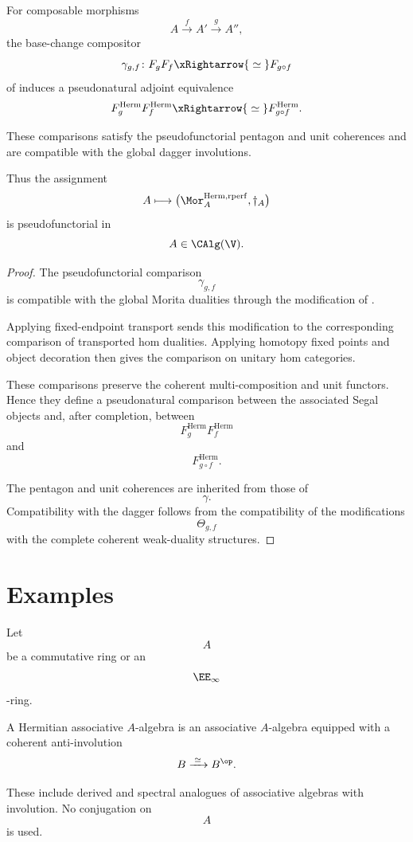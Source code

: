 \begin{proposition}
\label{prop:hermitian-morita-base-change-pseudofunctorial}
For composable morphisms
\[
    A
    \xrightarrow{f}
    A'
    \xrightarrow{g}
    A'',
\]
the base-change compositor
\[
    \gamma_{g,f}
    \colon
    F_gF_f
    \xRightarrow{\;\simeq\;}
    F_{g\circ f}
\]
of
induces a pseudonatural adjoint equivalence
\[
    F_g^{\mathrm{Herm}}
    F_f^{\mathrm{Herm}}
    \xRightarrow{\;\simeq\;}
    F_{g\circ f}^{\mathrm{Herm}}.
\]

These comparisons satisfy the pseudofunctorial pentagon and unit
coherences and are compatible with the global dagger involutions.

Thus the assignment
\[
    A
    \longmapsto
    \bigl(
        \Mor_A^{\mathrm{Herm,rperf}},
        \dagger_A
    \bigr)
\]
is pseudofunctorial in
\[
    A\in\CAlg(\V).
\]
\end{proposition}

\begin{proof}
The pseudofunctorial comparison
\[
    \gamma_{g,f}
\]
is compatible with the global Morita dualities through the modification
of
.

Applying fixed-endpoint transport sends this modification to the
corresponding comparison of transported hom dualities. Applying
homotopy fixed points and object decoration then gives the comparison on
unitary hom categories.

These comparisons preserve the coherent multi-composition and unit
functors. Hence they define a pseudonatural comparison between the
associated Segal objects and, after completion, between
\[
    F_g^{\mathrm{Herm}}F_f^{\mathrm{Herm}}
\]
and
\[
    F_{g\circ f}^{\mathrm{Herm}}.
\]

The pentagon and unit coherences are inherited from those of
\[
    \gamma.
\]
Compatibility with the dagger follows from the compatibility of the
modifications
\[
    \Theta_{g,f}
\]
with the complete coherent weak-duality structures.
\end{proof}

\section{Examples}
\label{sec:examples-relative-hermitian-morita}

\begin{example}
\label{ex:derived-star-algebras}
Let
\[
    A
\]
be a commutative ring or an
\[
    \EE_\infty
\]
-ring.

A Hermitian associative $A$-algebra is an associative $A$-algebra
equipped with a coherent anti-involution
\[
    B
    \xrightarrow{\;\simeq\;}
    B^{\op}.
\]

These include derived and spectral analogues of associative algebras with
involution. No conjugation on
\[
    A
\]
is used.
\end{example}

